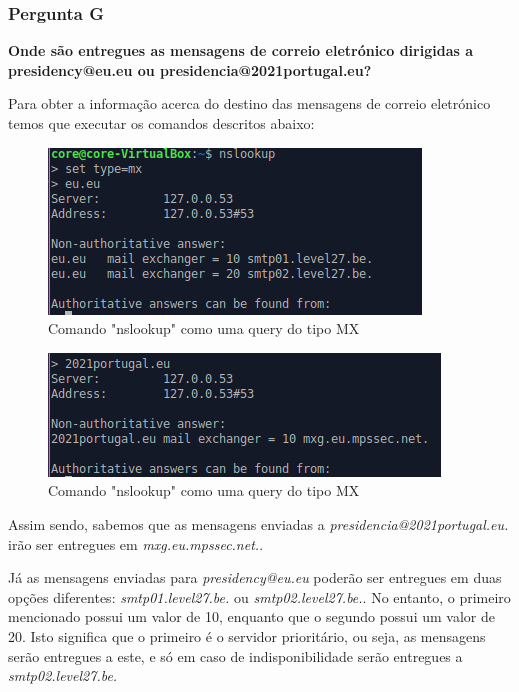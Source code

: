 \documentclass[11pt]{article}
\begin{document}
\subsubsection{Pergunta G}

\textbf{Onde são entregues as mensagens de correio eletrónico dirigidas a presidency@eu.eu ou presidencia@2021portugal.eu?}

\par Para obter a informação acerca do destino das mensagens de correio eletrónico temos que executar os comandos descritos abaixo:

\begin{figure}[!htb]
    \centering
    \includegraphics[width=.5\textwidth]{images/Parte1/p1_g1.PNG}
    \caption{Comando "nslookup" como uma query do tipo MX}
    \label{fig:emailMX}
\end{figure}

\begin{figure}[!htb]
    \centering
    \includegraphics[width=.5\textwidth]{images/Parte1/p1_g2.PNG}
    \caption{Comando "nslookup" como uma query do tipo MX}
    \label{fig:emailMX}
\end{figure}

\par Assim sendo, sabemos que as mensagens enviadas a \textit{presidencia@2021portugal.eu.} irão ser entregues em \textit{mxg.eu.mpssec.net.}.

\par Já as mensagens enviadas para \textit{presidency@eu.eu} poderão ser entregues em duas opções diferentes: \textit{smtp01.level27.be.} ou \textit{smtp02.level27.be.}. No entanto, o primeiro mencionado possui um valor de 10, enquanto que o segundo possui um valor de 20. Isto significa que o primeiro é o servidor prioritário, ou seja, as mensagens serão entregues a este, e só em caso de indisponibilidade serão entregues a \textit{smtp02.level27.be.}

\end{document}
